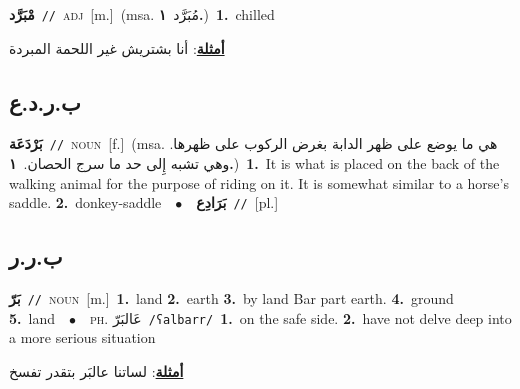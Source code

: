 \documentclass[10pt,a4paper,twoside]{article} %
\begin{document}
\begin{multicols}{2}
{\setlength\topsep{0pt}\textbf{\foreignlanguage{arabic}{مْبَرَّد}}\ {\color{gray}\texttt{//}\color{black}}\ \textsc{adj}\ [m.]\ \color{gray}(msa. \foreignlanguage{arabic}{مُبَرَّد}~\foreignlanguage{arabic}{\textbf{١.}})\color{black}\ \textbf{1.}~chilled\  \begin{flushright}\color{gray}\foreignlanguage{arabic}{\textbf{\underline{\foreignlanguage{arabic}{أمثلة}}}: أنا بشتريش غير اللحمة المبردة}\end{flushright}\color{black}} \vspace{2mm}

\vspace{-3mm}
\subsection*{\color{blue}\foreignlanguage{arabic}{ب.ر.د.ع}\color{blue}{}} 

{\setlength\topsep{0pt}\textbf{\foreignlanguage{arabic}{بَرْدَعَة}}\ {\color{gray}\texttt{//}\color{black}}\ \textsc{noun}\ [f.]\ \color{gray}(msa. \foreignlanguage{arabic}{هي ما يوضع على ظهر الدابة بغرض الركوب على ظهرها. وهي تشبه إِلى حد ما سرج الحصان.}~\foreignlanguage{arabic}{\textbf{١.}})\color{black}\ \textbf{1.}~It is what is placed on the back of the walking animal for the purpose of riding on it. It is somewhat similar to a horse's saddle.  \textbf{2.}~donkey-saddle\ \ $\bullet$\ \ \setlength\topsep{0pt}\textbf{\foreignlanguage{arabic}{بَرَادِع}}\ {\color{gray}\texttt{//}\color{black}}\ [pl.]\ } \vspace{2mm}

\vspace{-3mm}
\subsection*{\color{blue}\foreignlanguage{arabic}{ب.ر.ر}\color{blue}{}} 

{\setlength\topsep{0pt}\textbf{\foreignlanguage{arabic}{بَرّ}}\ {\color{gray}\texttt{//}\color{black}}\ \textsc{noun}\ [m.]\ \textbf{1.}~land  \textbf{2.}~earth  \textbf{3.}~by land Bar part earth.  \textbf{4.}~ground  \textbf{5.}~land\ \ $\bullet$\ \ \textsc{ph.} \color{gray} \foreignlanguage{arabic}{عَالبَرّ}\color{black}\ {\color{gray}\texttt{/{\sffamily ʕalbarr}/}\color{black}}\ \textbf{1.}~on the safe side.  \textbf{2.}~have not delve deep into a more serious situation\  \begin{flushright}\color{gray}\foreignlanguage{arabic}{\textbf{\underline{\foreignlanguage{arabic}{أمثلة}}}: لساتنا عالبَر بتقدر تفسخ}\end{flushright}\color{black}} \vspace{2mm}


\end{multicols}
\end{document}
